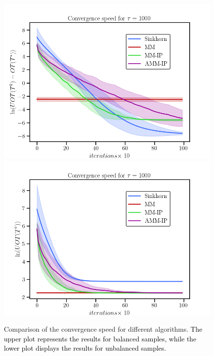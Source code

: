 \documentclass[a4paper,twocolumn]{article}
\newcommand{\changeSX}[1]{\textcolor{black}{#1}}
\begin{document}
\begin{figure}[t]
\centering
\includegraphics[width = 0.99\linewidth]{pic/ex1}
\centering
\includegraphics[width = 0.99\linewidth]{pic/ex3}
\caption{Comparison of the convergence speed for different algorithms. \changeSX{The upper plot represents the results for balanced samples, while the lower plot displays the results for unbalanced samples.}}
\label{Fig:ex1}
\end{figure}
\end{document}
